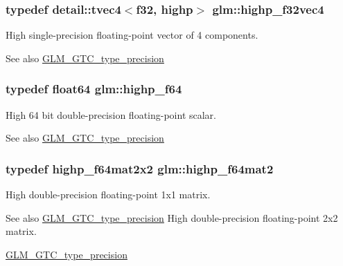 \subsubsection[{\texorpdfstring{highp\+\_\+f32vec4}{highp_f32vec4}}]{\setlength{\rightskip}{0pt plus 5cm}typedef detail\+::tvec4$<$f32, highp$>$ {\bf glm\+::highp\+\_\+f32vec4}}\hypertarget{group__gtc__type__precision_ga53d3c1a17e2e6f26ee5ad1e8879d710e}{}\label{group__gtc__type__precision_ga53d3c1a17e2e6f26ee5ad1e8879d710e}
High single-\/precision floating-\/point vector of 4 components. \begin{DoxySeeAlso}{See also}
\hyperlink{group__gtc__type__precision}{G\+L\+M\+\_\+\+G\+T\+C\+\_\+type\+\_\+precision} 
\end{DoxySeeAlso}
\subsubsection[{\texorpdfstring{highp\+\_\+f64}{highp_f64}}]{\setlength{\rightskip}{0pt plus 5cm}typedef float64 {\bf glm\+::highp\+\_\+f64}}\hypertarget{group__gtc__type__precision_gab1306a5a8ae99fb2867b548b1546bbe0}{}\label{group__gtc__type__precision_gab1306a5a8ae99fb2867b548b1546bbe0}
High 64 bit double-\/precision floating-\/point scalar. \begin{DoxySeeAlso}{See also}
\hyperlink{group__gtc__type__precision}{G\+L\+M\+\_\+\+G\+T\+C\+\_\+type\+\_\+precision} 
\end{DoxySeeAlso}
\subsubsection[{\texorpdfstring{highp\+\_\+f64mat2}{highp_f64mat2}}]{\setlength{\rightskip}{0pt plus 5cm}typedef highp\+\_\+f64mat2x2 {\bf glm\+::highp\+\_\+f64mat2}}\hypertarget{group__gtc__type__precision_ga7d9fd446fd43310ba6f63c8f9468acc0}{}\label{group__gtc__type__precision_ga7d9fd446fd43310ba6f63c8f9468acc0}
High double-\/precision floating-\/point 1x1 matrix. \begin{DoxySeeAlso}{See also}
\hyperlink{group__gtc__type__precision}{G\+L\+M\+\_\+\+G\+T\+C\+\_\+type\+\_\+precision} High double-\/precision floating-\/point 2x2 matrix. 

\hyperlink{group__gtc__type__precision}{G\+L\+M\+\_\+\+G\+T\+C\+\_\+type\+\_\+precision} 
\end{DoxySeeAlso}
